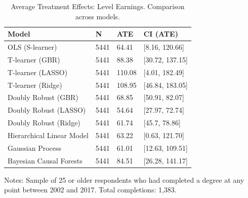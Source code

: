 \documentclass[12pt, a4paper]{article}
\begin{document}
\begin{landscape}
\clearpage
\begin{table}[htbp]
\centering
\small
\caption{Average Treatment Effects: Level Earnings. Comparison across models.}
\begin{tabular}{p{} C{0.1\textwidth} C{0.1\textwidth} C{0.2\textwidth}}
\toprule
Model  &  N  &  ATE  &  CI (ATE)  \\
\midrule 	   						
OLS (S-learner)	 & 	5441	 & 	64.41	 & 	[8.16, 120.66]	 \\
T-learner (GBR)	 & 	5441	 & 	88.38	 & 	[30.72, 137.15]	 \\
T-learner (LASSO)	 & 	5441	 & 	110.08	 & 	[4.01, 182.49]	 \\
T-learner (Ridge)	 & 	5441	 & 	108.95	 & 	[46.84, 183.05]	 \\
Doubly Robust (GBR)	 & 	5441	 & 	68.85	 & [50.91, 82.07] \\
Doubly Robust (LASSO)	 & 	5441	 & 	54.64	 & 	[27.97, 72.74]	 \\
Doubly Robust (Ridge)	 & 	5441	 & 	61.74	 & 	[45.7, 78.86]	 \\
Hierarchical Linear Model	 & 	5441	 & 	63.22 & [0.63, 121.70]  \\
Gaussian Process  & 	5441	 & 	61.01	 & 	[12.63, 109.51]	 \\
Bayesian Causal Forests  & 5441 & 84.51 & [26.28, 141.17] \\
\bottomrule
\end{tabular}
\par\medskip
\parbox{1.0\textwidth}{\footnotesize Notes: Sample of 25 or older respondents who had completed a degree at any point between 2002 and 2017. Total completions: 1,383.}
\label{tab:atebslvl}
\end{table}










\end{landscape}
\end{document}

